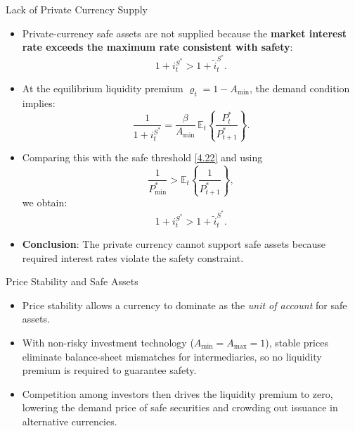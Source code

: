 \documentclass[11pt,aspectratio=169]{beamer}
\newcommand{\E}{\mathbb{E}}
\begin{document}
\begin{frame}{Lack of Private Currency Supply}
\small
\begin{itemize}

\item Private-currency safe assets are not supplied because the \textbf{market interest rate exceeds the maximum rate consistent with safety}:
\[
1+i_t^{S^\ast} > 1+\tilde{i}_t^{S^\ast}.
\]

\item At the equilibrium liquidity premium $\varrho_t = 1 - A_{\min}$, the demand condition implies:
\[
\frac{1}{1+i_t^{S^\ast}}
= \frac{\beta}{A_{\min}} \, \E_t\!\left\{\frac{P_t^\ast}{P_{t+1}^\ast}\right\}.
\]

\item Comparing this with the safe threshold \eqref{4.22} and using  
\[
\frac{1}{P_{\min}^\ast} > \E_t\!\left\{\frac{1}{P_{t+1}^\ast}\right\},
\]
we obtain:
\[
1+i_t^{S^\ast} > 1+\tilde{i}_t^{S^\ast}.
\]

\item \textbf{Conclusion}: The private currency cannot support safe assets because required interest rates violate the safety constraint.

\end{itemize}
\end{frame}

\begin{frame}{Price Stability and Safe Assets}
\small
\begin{itemize}

\item Price stability allows a currency to dominate as the \emph{unit of account} for safe assets.

\vspace{0.6em}

\item With non-risky investment technology ($A_{\min}=A_{\max}=1$), stable prices eliminate balance-sheet mismatches for intermediaries, so no liquidity premium is required to guarantee safety.

\vspace{0.6em}

\item Competition among investors then drives the liquidity premium to zero, lowering the demand price of safe securities and crowding out issuance in alternative currencies.

\end{itemize}
\end{frame}
\end{document}
